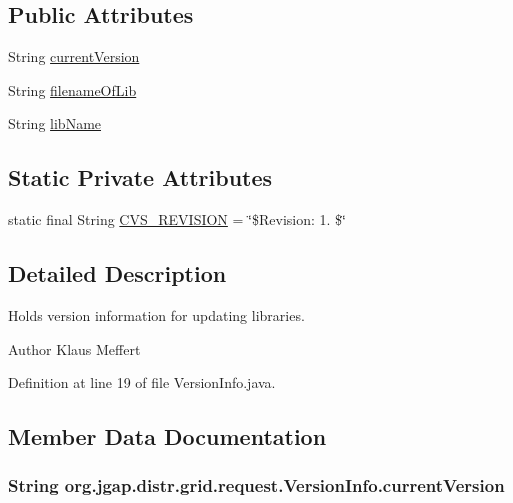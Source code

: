 \subsection*{Public Attributes}
\begin{DoxyCompactItemize}
\item 
String \hyperlink{classorg_1_1jgap_1_1distr_1_1grid_1_1request_1_1_version_info_a2d77c72780a46dd42dfb080d0d18ee75}{current\-Version}
\item 
String \hyperlink{classorg_1_1jgap_1_1distr_1_1grid_1_1request_1_1_version_info_a5a89c6eaf978c545b27d5fa045c0167c}{filename\-Of\-Lib}
\item 
String \hyperlink{classorg_1_1jgap_1_1distr_1_1grid_1_1request_1_1_version_info_a124e74f01d2cef6295942c18912e850a}{lib\-Name}
\end{DoxyCompactItemize}
\subsection*{Static Private Attributes}
\begin{DoxyCompactItemize}
\item 
static final String \hyperlink{classorg_1_1jgap_1_1distr_1_1grid_1_1request_1_1_version_info_a25130a75a1287a12338297483a69f975}{C\-V\-S\-\_\-\-R\-E\-V\-I\-S\-I\-O\-N} = \char`\"{}\$Revision\-: 1. \$\char`\"{}
\end{DoxyCompactItemize}


\subsection{Detailed Description}
Holds version information for updating libraries.

\begin{DoxyAuthor}{Author}
Klaus Meffert 
\end{DoxyAuthor}


Definition at line 19 of file Version\-Info.\-java.



\subsection{Member Data Documentation}
\hypertarget{classorg_1_1jgap_1_1distr_1_1grid_1_1request_1_1_version_info_a2d77c72780a46dd42dfb080d0d18ee75}{
\subsubsection[{current\-Version}]{\setlength{\rightskip}{0pt plus 5cm}String org.\-jgap.\-distr.\-grid.\-request.\-Version\-Info.\-current\-Version}}\label{classorg_1_1jgap_1_1distr_1_1grid_1_1request_1_1_version_info_a2d77c72780a46dd42dfb080d0d18ee75}


